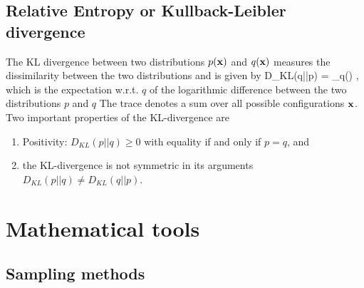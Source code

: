 \subsection{Relative Entropy or Kullback-Leibler divergence}
\label{subsec:infoRelEntropy}
The KL divergence between two distributions $p(\mathbf{x})$ and $q(\mathbf{x})$ measures the dissimilarity between the two distributions and is given by
\be 
\label{eq:infoKLdivergence}
D_{KL}(q||p) = _{\mx}q(\mx) \log {},
\ee 
which is the expectation w.r.t. $q$ of the logarithmic difference between the two distributions $p$ and $q$ The trace denotes a sum over all possible configurations $\mathbf{x}$. Two important properties of the KL-divergence are 
\begin{enumerate}
	\item Positivity: $D_{KL}(p||q)\geq 0$ with equality if and only if $p=q$, and
	\item the KL-divergence is not symmetric in its arguments $D_{KL}(p||q) \neq D_{KL} (q||p)$.
\end{enumerate}












\section{Mathematical tools}
\label{sec:math}
\subsection{Sampling methods}

